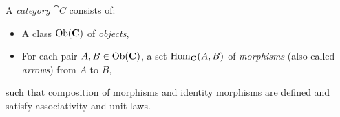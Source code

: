 \documentclass[12pt]{book}
\begin{document}
\begin{definition}
A \emph{category} \( \cat{C} \) consists of:
\begin{itemize}[nosep]
  \item A class \( \mathrm{Ob}(\mathbf{C}) \) of \emph{objects},
  \item For each pair \( A, B \in \mathrm{Ob}(\mathbf{C}) \), a set \( \mathrm{Hom}_{\mathbf{C}}(A, B) \) of \emph{morphisms} (also called \emph{arrows}) from \( A \) to \( B \),
\end{itemize}
such that composition of morphisms and identity morphisms are defined and satisfy associativity and unit laws.
\end{definition}
\end{document}
